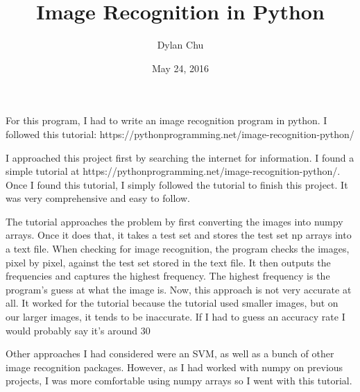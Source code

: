 \documentclass{article}
\title{Image Recognition in Python}
\author{Dylan Chu}
\date{May 24, 2016}
\begin{document}
	\maketitle
	For this program, I had to write an image recognition program in python.  I followed this tutorial: https://pythonprogramming.net/image-recognition-python/
	
	
	I approached this project first by searching the internet for information.  I found a simple tutorial at https://pythonprogramming.net/image-recognition-python/.  Once I found this tutorial, I simply followed the tutorial to finish this project.  It was very comprehensive and easy to follow.
	
	The tutorial approaches the problem by first converting the images into numpy arrays.  Once it does that, it takes a test set and stores the test set np arrays into a text file.  When checking for image recognition, the program checks the images, pixel by pixel, against the test set stored in the text file.  It then outputs the frequencies and captures the highest frequency.  The highest frequency is the program's guess at what the image is.  Now, this approach is not very accurate at all.  It worked for the tutorial because the tutorial used smaller images, but on our larger images, it tends to be inaccurate.  If I had to guess an accuracy rate I would probably say it's around 30%
	
	Other approaches I had considered were an SVM, as well as a bunch of other image recognition packages.  However, as I had worked with numpy on previous projects, I was more comfortable using numpy arrays so I went with this tutorial.
	
	
\end{document}
